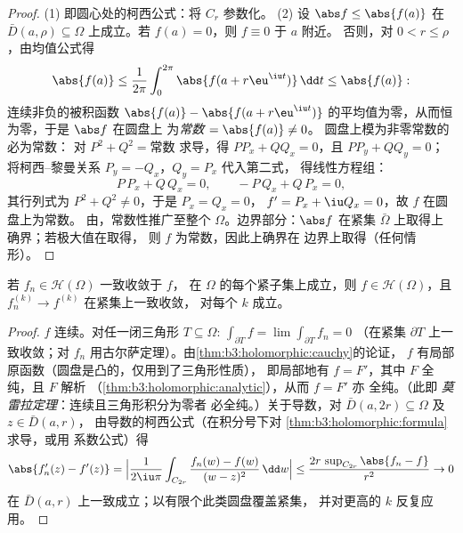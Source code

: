 \begin{proof}
(1) 即圆心处的柯西公式：将 $C_r$ 参数化。
(2) 设 $\abs f \leq \abs{f(a)}$ 在 $\bar D(a, \rho)
\subseteq \Omega$ 上成立。若 $f(a) = 0$，则 $f \equiv 0$ 于 $a$ 附近。
否则，对 $0 < r \leq \rho$，由均值公式得
\[
\abs{f(a)} \leq \frac1{2\pi}\int_0^{2\pi}\abs{f(a +
r\eu^{\iu t})}\,\dd t \leq \abs{f(a)} :
\]
连续非负的被积函数 $\abs{f(a)} - \abs{f(a +
r\eu^{\iu t})}$ 的平均值为零，从而恒为零，于是 $\abs f$ 在圆盘上
为\emph{常数} $= \abs{f(a)} \ne 0$。
圆盘上模为非零常数的必为常数：
对 $P^2 + Q^2 = \text{常数}$ 求导，得 $PP_x + QQ_x
= 0$，且 $PP_y + QQ_y = 0$；将柯西–黎曼关系
$P_y = -Q_x$，$Q_y = P_x$ 代入第二式，
得线性方程组：
\[
P\,P_x + Q\,Q_x = 0, \qquad -P\,Q_x + Q\,P_x = 0,
\]
其行列式为 $P^2 + Q^2 \neq 0$，于是 $P_x = Q_x = 0$，
$f' = P_x + \iu Q_x = 0$，故 $f$ 在圆盘上为常数。
由，常数性推广至整个 $\Omega$。边界部分：$\abs f$
在紧集 $\bar\Omega$ 上取得上确界；若极大值在取得，
则 $f$ 为常数，因此上确界在
边界上取得（任何情形）。
\end{proof}

\begin{theorem}[魏尔斯特拉斯收敛定理]
\label{thm:b3:holomorphic:weierstrassconv}
若 $f_n \in \mathcal H(\Omega)$ 一致收敛于 $f$，
在 $\Omega$ 的每个紧子集上成立，则 $f \in \mathcal
H(\Omega)$，且 $f_n^{(k)} \to f^{(k)}$ 在紧集上一致收敛，
对每个 $k$ 成立。
\end{theorem}

\begin{proof}
$f$ 连续。对任一闭三角形 $T \subseteq
\Omega$: $\int_{\partial T}f = \lim\int_{\partial T}f_n = 0$
（在紧集 $\partial T$ 上一致收敛；对
$f_n$ 用古尔萨定理）。由\cref{thm:b3:holomorphic:cauchy}的论证，
$f$ 有局部原函数（圆盘是凸的，仅用到了三角形性质），
即局部地有 $f = F'$，其中 $F$
全纯，且 $F$ 解析
（\cref{thm:b3:holomorphic:analytic}），从而 $f = F'$ 亦
全纯。（此即
\emph{莫雷拉定理}：连续且三角形积分为零者
必全纯。）关于导数，对
$\bar D(a, 2r) \subseteq \Omega$ 及 $z \in \bar D(a, r)$，
由导数的柯西公式（在积分号下对
\cref{thm:b3:holomorphic:formula}求导，或用
系数公式）得
\[
\abs{f_n'(z) - f'(z)} =
\Bigl|\frac{1}{2\iu\pi}\int_{C_{2r}}\frac{f_n(w) - f(w)}{(w -
z)^2}\,\dd w\Bigr|
\leq \frac{2r\,\sup_{C_{2r}}\abs{f_n - f}}{r^2} \to 0
\]
在 $\bar D(a,r)$ 上一致成立；以有限个此类圆盘覆盖紧集，
并对更高的 $k$ 反复应用。
\end{proof}

